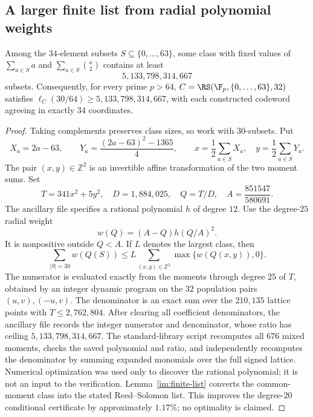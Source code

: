 \subsection{A larger finite list from radial polynomial weights}
\label{sec:radial-certificate}

\begin{proposition}
\label{prop:radial-certificate}
Among the $34$-element subsets $S\subseteq\{0,\ldots,63\}$, some class with
fixed values of $\sum_{a\in S}a$ and $\sum_{a\in S}\binom a2$ contains at least
\[
  5{,}133{,}798{,}314{,}667
\]
subsets. Consequently, for every prime $p>64$,
$C=\RS(\F_p,\{0,\ldots,63\},32)$ satisfies
$\ell_C(30/64)\ge5{,}133{,}798{,}314{,}667$, with each constructed
codeword agreeing in exactly $34$ coordinates.
\end{proposition}
\begin{proof}
Taking complements preserves class sizes, so work with $30$-subsets.
Put
\[
 X_a=2a-63,\qquad Y_a=\frac{(2a-63)^2-1365}{4},\qquad
 x=\frac12\sum_{a\in S}X_a,\quad y=\frac12\sum_{a\in S}Y_a.
\]
The pair $(x,y)\in\mathbb Z^2$ is an invertible affine transformation of the
two moment sums.  Set
\[
 T=341x^2+5y^2,\quad D=1{,}884{,}025,\quad
 Q=T/D,\quad A=\frac{851547}{580691}.
\]
The ancillary file  specifies a rational
polynomial $h$ of degree $12$.  Use the degree-$25$ radial weight
\[
 w(Q)=(A-Q)h(Q/A)^2.
\]
It is nonpositive outside $Q<A$.  If $L$ denotes the largest class, then
\[
 \sum_{|S|=30}w(Q(S))
 \le L\sum_{(x,y)\in\mathbb Z^2}\max\{w(Q(x,y)),0\}.
\]
The numerator is evaluated exactly from the moments through degree $25$
of $T$, obtained by an integer dynamic program on the $32$ population pairs
$(u,v),(-u,v)$.  The denominator is an exact sum over the $210{,}135$ lattice
points with $T\le2{,}762{,}804$.  After clearing all coefficient denominators,
the ancillary file records the integer numerator and denominator, whose
ratio has ceiling $5{,}133{,}798{,}314{,}667$.
The standard-library script  recomputes all
$676$ mixed moments, checks the saved polynomial and ratio, and independently
recomputes the denominator by summing expanded monomials over the full signed
lattice.  Numerical optimization was used only to discover the rational
polynomial; it is not an input to the verification.
Lemma~\ref{im:finite-list} converts the common-moment class into the
stated Reed--Solomon list. This improves the degree-$20$ conditional
certificate by approximately $1.17\%$; no optimality is claimed.
\end{proof}
